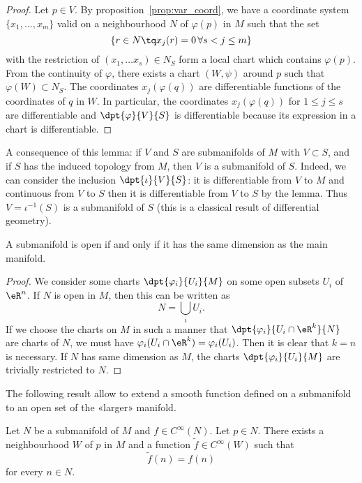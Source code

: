 \begin{proof}
Let $p\in V$. By proposition~\ref{prop:var_coord}, we have  a coordinate system $\{x_1,\ldots,x_m\}$ valid on a neighbourhood $N$ of $\varphi(p)$ in $M$ such that the set
\[
  \{r\in N\tq x_j(r)=0\, \forall s<j\leq m  \}
\]
with the restriction of $(x_1,\ldots x_s)\in N_S$ form a local chart which contains $\varphi(p)$. From the continuity of $\varphi$, there exists a chart $(W,\psi)$ around $p$ such that $\varphi(W)\subset N_S$. The coordinates $x_j(\varphi(q))$ are differentiable functions of  the coordinates of $q$ in $W$. In particular, the coordinates $x_j(\varphi(q))$ for $1\leq j\leq s$ are differentiable and $\dpt{\varphi}{V}{S}$ is differentiable because its expression in a chart is differentiable.
\end{proof}

A consequence of this lemma: if $V$ and $S$ are submanifolds of $M$ with $V\subset S$, and if $S$ has the induced topology from $M$, then $V$ is a submanifold of $S$. Indeed, we can consider the inclusion $\dpt{\iota}{V}{S}$: it is differentiable from $V$ to $M$ and continuous from $V$ to $S$ then it is differentiable from $V$ to $S$ by the lemma. Thus $V=\iota^{-1}(S)$ is a submanifold of $S$ (this is a classical result of differential geometry).

\begin{proposition}
A submanifold is open if and only if it has the same dimension as the main manifold.
\label{prop:subvar_ouvert}
\end{proposition}

\begin{proof}
We consider some charts $\dpt{\varphi_i}{U_i}{M}$ on some open subsets $U_i$ of $\eR^n$. If $N$ is open in $M$, then this can be written as
\[
  N=\bigcup_iU_i.
\]
If we choose the charts on $M$ in such a manner that $\dpt{\varphi_i}{U_i\cap \eR^k}{N}$ are charts of $N$, we must have $\varphi_i(U_i\cap\eR^k)=\varphi_i(U_i)$. Then it is clear that $k=n$ is necessary.
If $N$ has same dimension as $M$, the charts $\dpt{\varphi_i}{U_i}{M}$ are trivially restricted to $N$.
\end{proof}

The following result allow to extend a smooth function defined on a submanifold to an open set of the «larger» manifold. 
\begin{proposition}     \label{PROPooOTZQooIfboXV}
    Let \( N\) be a submanifold of \( M\) and \( f\in  C^{\infty}(N)\). Let \( p\in N\). There exists a neighbourhood \( W\) of \( p\) in \( M\) and a function \( \tilde f\in  C^{\infty}(W)\) such that
    \begin{equation}
        \tilde f(n)=f(n)
    \end{equation}
    for every \( n\in N\).
\end{proposition}

